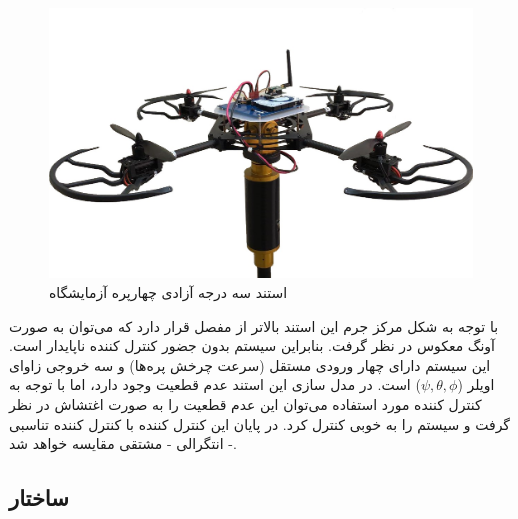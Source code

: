 \begin{figure}[H]\label{LabQuad}
	\includegraphics[width=12cm]{figs/introduction/3DOFQuad.jpg}
	\centering
	\caption{استند سه درجه آزادی چهارپره آزمایشگاه
		\cite{Iranlabexpo}}
\end{figure}
با توجه به شکل مرکز جرم این استند بالاتر از مفصل قرار دارد که می‌توان به صورت آونگ معکوس در نظر گرفت. بنابراین سیستم بدون جضور کنترل کننده ناپایدار است. این سیستم دارای چهار ورودی مستقل (سرعت چرخش پره‌ها) و سه خروجی زاوای اویلر ($\psi, \theta, \phi$) است. در مدل سازی این استند عدم قطعیت وجود دارد، اما با توجه به کنترل کننده مورد استفاده می‌توان این عدم قطعیت را به صورت اغتشاش در نظر گرفت و سیستم را به خوبی کنترل کرد. در پایان این کنترل کننده با کنترل کننده تناسبی - انتگرالی -
مشتقی مقایسه خواهد ‌شد.


\subsection{ساختار}

